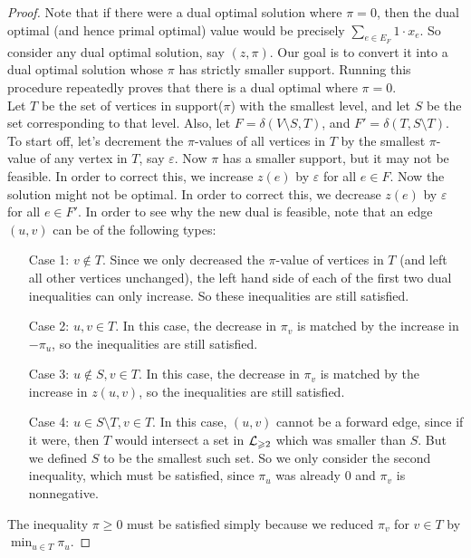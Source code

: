 \documentclass[./main.tex]{subfiles}
\begin{document}
		\begin{proof}
			Note that if there were a dual optimal solution where $\pi = 0$, then the dual optimal (and hence primal optimal) value would be precisely $\sum_{e\in E_F}1\cdot x_e$. 
			So consider any dual optimal solution, say $(z,\pi)$. Our goal is to convert it into a dual optimal solution whose $\pi$ has strictly smaller support. 
			Running this procedure repeatedly proves that there is a dual optimal where $\pi = 0$.\vspace{2mm}
			\\Let $T$ be the set of vertices in support($\pi$) with the smallest level, and let $S$ be the set corresponding to that level.
			Also, let $F = \delta(V\setminus S, T)$, and $F' = \delta(T,S\setminus T)$.
			\\To start off, let's decrement the $\pi$-values of all vertices in $T$ by the smallest $\pi$-value of any vertex in $T$, say $\varepsilon$. Now $\pi$ has a smaller support, but it may not be feasible. In order to correct this, we increase $z(e)$ by $\varepsilon$ for all $e\in F$. Now the solution might not be optimal. In order to correct this, we decrease $z(e)$ by $\varepsilon$ for all $e\in F'$. In order to see why the new dual is feasible, note that an edge $(u,v)$ can be of the following types:
				\begin{itemize}
					\item[Case 1:] $v\notin T$. Since we only decreased the $\pi$-value of vertices in $T$ (and left all other vertices unchanged), the left hand side of each of the first two dual inequalities can only increase. So these inequalities are still satisfied.
					\item[Case 2:] $u,v\in T$. In this case, the decrease in $\pi_v$ is matched by the increase in $-\pi_u$, so the inequalities are still satisfied.
					\item[Case 3:] $u\notin S, v\in T$. In this case, the decrease in $\pi_v$ is matched by the increase in $z(u,v)$, so the inequalities are still satisfied.
					\item[Case 4:] $u\in S\setminus T, v\in T$. In this case, $(u,v)$ cannot be a forward edge, since if it were, then $T$ would intersect a set in $\mathcal{L}_{\geqslant 2}$ which was smaller than $S$. But we defined $S$ to be the smallest such set. So we only consider the second inequality, which must be satisfied, since $\pi_u$ was already $0$ and $\pi_v$ is nonnegative.
				\end{itemize}
			The inequality $\pi\geqslant 0$ must be satisfied simply because we reduced $\pi_v$ for $v\in T$ by $\min_{u\in T}\pi_u$. 

\end{proof}
\end{document}

